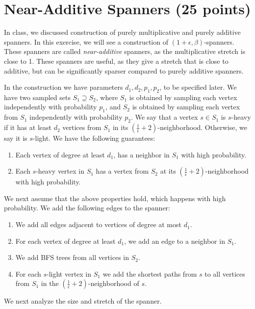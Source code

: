 \documentclass[11pt]{article}
\begin{document}
\section{Near-Additive Spanners (25 points)}

In class, we discussed construction of purely multiplicative and purely additive spanners. In this exercise, we will see a construction of $(1+\epsilon,\beta)$-spanners. These spanners are called \emph{near-additive} spanners, as the multiplicative stretch is close to 1. These spanners are useful, as they give a stretch that is close to additive, but can be significantly sparser compared to purely additive spanners.

In the construction we have parameters $d_1,d_2,p_1,p_2$, to be specified later.
We have two sampled sets $S_1 \supseteq S_2$, where $S_1$ is obtained by sampling each vertex independently with probability $p_1$, and $S_2$ is obtained by sampling each vertex from $S_1$ independently with probability $p_2$.
We say that a vertex $s \in S_1$ is $s$-heavy if it has at least $d_2$ vertices from $S_1$ in its $(\frac{1}{\epsilon} + 2)$-neighborhood. Otherwise, we say it is $s$-light.
We have the following guarantees:
\begin{enumerate}
    \item Each vertex of degree at least $d_1$, has a neighbor in $S_1$ with high probability.
    \item Each $s$-heavy vertex in $S_1$ has a vertex from $S_2$ at its $(\frac{1}{\epsilon} + 2)$-neighborhood with high probability. 
\end{enumerate}

We next assume that the above properties hold, which happens with high probability.
We add the following edges to the spanner:
\begin{enumerate}
    \item We add all edges adjacent to vertices of degree at most $d_1$.
    \item For each vertex of degree at least $d_1$, we add an edge to a neighbor in $S_1$.
    \item We add BFS trees from all vertices in $S_2$.
    \item For each $s$-light vertex in $S_1$ we add the shortest paths from $s$ to all vertices from $S_1$ in the $(\frac{1}{\epsilon} + 2)$-neighborhood of $s$. 
\end{enumerate}

We next analyze the size and stretch of the spanner.
\end{document}
